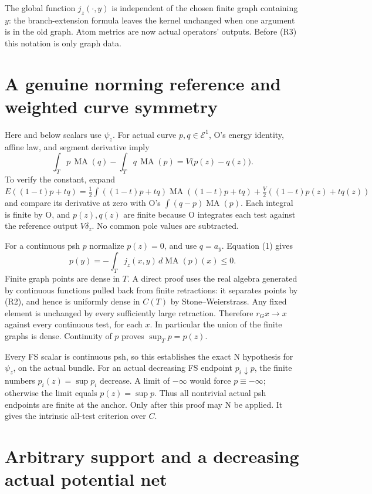 \documentclass[
  11pt,
]{article}
\begin{document}
The global function \(j_z(\cdot,y)\) is independent of the chosen finite
graph containing \(y\): the branch-extension formula leaves the kernel
unchanged when one argument is in the old graph. Atom metrics are now
actual operators' outputs. Before (R3) this notation is only graph data.

\section{A genuine norming reference and weighted curve
symmetry}\label{a-genuine-norming-reference-and-weighted-curve-symmetry}

Here and below scalars use \(\psi_z\). For actual curve
\(p,q\in\mathcal E^1\), O's energy identity, affine law, and segment
derivative imply \[
 \int_Tp\,\operatorname{MA}(q)-\int_Tq\,\operatorname{MA}(p)
       =V\bigl(p(z)-q(z)\bigr). \tag{1}
\] To verify the constant, expand
\(E((1-t)p+tq)=\frac12\int((1-t)p+tq)\operatorname{MA}((1-t)p+tq)+\frac V2((1-t)p(z)+tq(z))\)
and compare its derivative at zero with O's
\(\int(q-p)\operatorname{MA}(p)\). Each integral is finite by O, and
\(p(z),q(z)\) are finite because O integrates each test against the
reference output \(V\delta_z\). No common pole values are subtracted.

For a continuous psh \(p\) normalize \(p(z)=0\), and use \(q=a_y\).
Equation (1) gives \[
 p(y)=-\int_Tj_z(x,y)\,d\operatorname{MA}(p)(x)\leq0. \tag{2}
\] Finite graph points are dense in \(T\). A direct proof uses the real
algebra generated by continuous functions pulled back from finite
retractions: it separates points by (R2), and hence is uniformly dense
in \(C(T)\) by Stone--Weierstrass. Any fixed element is unchanged by
every sufficiently large retraction. Therefore \(r_Gx\to x\) against
every continuous test, for each \(x\). In particular the union of the
finite graphs is dense. Continuity of \(p\) proves \(\sup_Tp=p(z)\).

Every FS scalar is continuous psh, so this establishes the exact N
hypothesis for \(\psi_z\), on the actual bundle. For an actual
decreasing FS endpoint \(p_i\downarrow p\), the finite numbers
\(p_i(z)=\sup p_i\) decrease. A limit of \(-\infty\) would force
\(p\equiv-\infty\); otherwise the limit equals \(p(z)=\sup p\). Thus all
nontrivial actual psh endpoints are finite at the anchor. Only after
this proof may N be applied. It gives the intrinsic all-test criterion
over \(C\).

\section{Arbitrary support and a decreasing actual potential
net}\label{arbitrary-support-and-a-decreasing-actual-potential-net}
\end{document}
